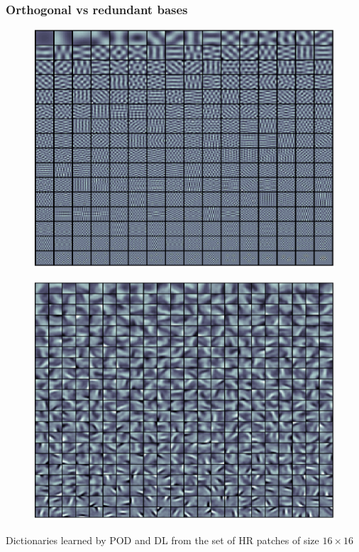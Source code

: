 \documentclass{beamer}
\begin{document}
\begin{frame}
	\frametitle{Orthogonal vs redundant bases} 
	\begin{minipage}{\textwidth}
		\begin{minipage}[b]{0.41\textwidth}
			\begin{figure}
				\includegraphics[width=\columnwidth]{./figures/DL/dictionary_PCA_patchsize04.eps}
			\end{figure}
		\end{minipage}
		\hfil
		\begin{minipage}[b]{0.57\textwidth}
			\begin{figure}
				\includegraphics[width=\columnwidth]{./figures/DL/dictionary_ODL_patchsize04_full.eps}
			\end{figure}
		\end{minipage}	
	\vspace{0.5cm}	
	\centering \scriptsize Dictionaries learned by POD and DL from the set of HR patches of size $ 16 \times 16 $
	\end{minipage}
\end{frame}
\end{document}
